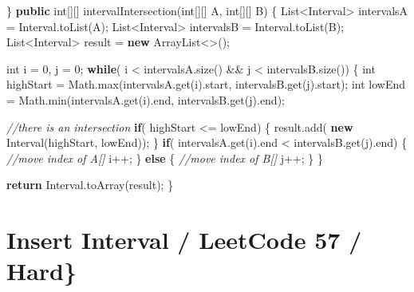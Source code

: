 \documentclass[]{book}
\newenvironment{Shaded}{\begin{snugshade}}{\end{snugshade}}
\newcommand{\BuiltInTok}[1]{#1}
\newcommand{\CommentTok}[1]{\textcolor[rgb]{0.56,0.35,0.01}{\textit{#1}}}
\newcommand{\DataTypeTok}[1]{\textcolor[rgb]{0.13,0.29,0.53}{#1}}
\newcommand{\DecValTok}[1]{\textcolor[rgb]{0.00,0.00,0.81}{#1}}
\newcommand{\FunctionTok}[1]{\textcolor[rgb]{0.00,0.00,0.00}{#1}}
\newcommand{\KeywordTok}[1]{\textcolor[rgb]{0.13,0.29,0.53}{\textbf{#1}}}
\newcommand{\NormalTok}[1]{#1}
\begin{document}
\begin{Shaded}
\begin{Highlighting}[]
\NormalTok{\}}
\KeywordTok{public} \DataTypeTok{int}\NormalTok{[][] }\FunctionTok{intervalIntersection}\NormalTok{(}\DataTypeTok{int}\NormalTok{[][] A, }\DataTypeTok{int}\NormalTok{[][] B) \{}
    \BuiltInTok{List}\NormalTok{<Interval> intervalsA = Interval.}\FunctionTok{toList}\NormalTok{(A);}
    \BuiltInTok{List}\NormalTok{<Interval> intervalsB = Interval.}\FunctionTok{toList}\NormalTok{(B);}
    \BuiltInTok{List}\NormalTok{<Interval> result = }\KeywordTok{new} \BuiltInTok{ArrayList}\NormalTok{<>();}

    \DataTypeTok{int}\NormalTok{ i = }\DecValTok{0}\NormalTok{, j = }\DecValTok{0}\NormalTok{;}
    \KeywordTok{while}\NormalTok{( i < intervalsA.}\FunctionTok{size}\NormalTok{() && j < intervalsB.}\FunctionTok{size}\NormalTok{()) \{}
        \DataTypeTok{int}\NormalTok{ highStart = }\BuiltInTok{Math}\NormalTok{.}\FunctionTok{max}\NormalTok{(intervalsA.}\FunctionTok{get}\NormalTok{(i).}\FunctionTok{start}\NormalTok{, intervalsB.}\FunctionTok{get}\NormalTok{(j).}\FunctionTok{start}\NormalTok{);}
        \DataTypeTok{int}\NormalTok{ lowEnd = }\BuiltInTok{Math}\NormalTok{.}\FunctionTok{min}\NormalTok{(intervalsA.}\FunctionTok{get}\NormalTok{(i).}\FunctionTok{end}\NormalTok{, intervalsB.}\FunctionTok{get}\NormalTok{(j).}\FunctionTok{end}\NormalTok{);}

        \CommentTok{//there is an intersection}
        \KeywordTok{if}\NormalTok{( highStart <= lowEnd) \{}
\NormalTok{            result.}\FunctionTok{add}\NormalTok{( }\KeywordTok{new} \FunctionTok{Interval}\NormalTok{(highStart, lowEnd));}
\NormalTok{        \}}
        \KeywordTok{if}\NormalTok{( intervalsA.}\FunctionTok{get}\NormalTok{(i).}\FunctionTok{end}\NormalTok{ < intervalsB.}\FunctionTok{get}\NormalTok{(j).}\FunctionTok{end}\NormalTok{) \{}
            \CommentTok{//move index of A[]}
\NormalTok{            i++;}
\NormalTok{        \} }\KeywordTok{else}\NormalTok{ \{}
            \CommentTok{//move index of B[]}
\NormalTok{            j++;}
\NormalTok{        \}}
\NormalTok{    \}}

    \KeywordTok{return}\NormalTok{ Interval.}\FunctionTok{toArray}\NormalTok{(result);}
\NormalTok{\}}
\end{Highlighting}
\end{Shaded}

\hypertarget{insert-interval-leetcode-57-hard}{%
\section{Insert Interval / LeetCode 57 / Hard\}}\label{insert-interval-leetcode-57-hard}}
\end{document}
